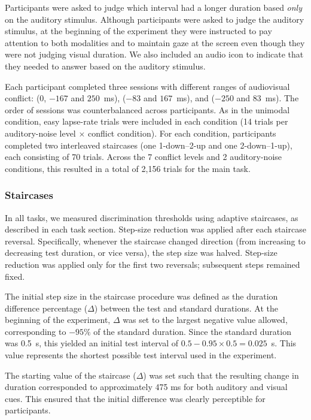 \documentclass{jov}
\begin{document}
Participants were asked to judge which interval had a longer duration based {\em only} on the auditory stimulus. Although participants were asked to judge the auditory stimulus, at the beginning of the experiment they were instructed to pay attention to both modalities and to maintain gaze at the screen even though they were not judging visual duration. We also included an audio icon to indicate that they needed to answer based on the auditory stimulus.

Each participant completed three sessions with different ranges of audiovisual conflict: (0, $-167$ and $250$~ms), ($-83$ and $167$~ms), and ($-250$ and $83$~ms). The order of sessions was counterbalanced across participants. As in the unimodal condition, easy lapse-rate trials were included in each condition (14 trials per auditory-noise level $\times$ conflict condition). For each condition, participants completed two interleaved staircases (one 1-down–2-up and one 2-down–1-up), each consisting of 70 trials. Across the 7 conflict levels and 2 auditory-noise conditions, this resulted in a total of 2,156 trials for the main task.

\subsubsection{Staircases}

In all tasks, we measured discrimination thresholds using adaptive staircases, as described in each task section. Step-size reduction was applied after each staircase reversal. Specifically, whenever the staircase changed direction (from increasing to decreasing test duration, or vice versa), the step size was halved. Step-size reduction was applied only for the first two reversals; subsequent steps remained fixed.

The initial step size in the staircase procedure was defined as the duration difference percentage ($\Delta$) between the test and standard durations. At the beginning of the experiment, $\Delta$ was set to the largest negative value allowed, corresponding to $-95\%$ of the standard duration. Since the standard duration was 0.5~s, this yielded an initial test interval of $0.5 - 0.95 \times 0.5 = 0.025$~s. This value represents the shortest possible test interval used in the experiment.

The starting value of the staircase ($\Delta$) was set such that the resulting change in duration corresponded to approximately 475 ms for both auditory and visual cues. This ensured that the initial difference was clearly perceptible for participants.
\end{document}
